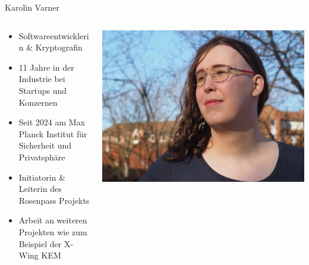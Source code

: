 \begin{frame}{Karolin Varner}
  \begin{columns}[fullwidth,c]

    \begin{column}{.7\linewidth}
      \begin{itemize}
        \item Softwareentwicklerin \& Kryptografin
        \item 11 Jahre in der Industrie bei Startups und Konzernen
        \item Seit 2024 am Max Planck Institut für Sicherheit und Privatsphäre
        \item Initiatorin \& Leiterin des Rosenpass Projekts
        \item Arbeit an weiteren Projekten wie zum Beispiel der X-Wing KEM
      \end{itemize}
    \end{column}%
    \begin{column}{.3\linewidth}
      \includegraphics[width=.92\linewidth,trim=200 0 100 0,clip]{graphics/karolin-varner.jpg}
    \end{column}
  \end{columns}
\end{frame}

